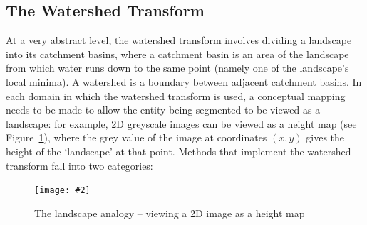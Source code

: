 \documentclass[a4paper]{article}
\newcommand{\stufigex}[5]					%
{
	\begin{figure}[#5]
	\begin{center}
		\texttt{[image: \#2]}
		\caption{#3}
		\label{#4}
	\end{center}
	\end{figure}
}
\begin{document}
\subsection{The Watershed Transform}

At a very abstract level, the watershed\footnotemark{} transform involves dividing a landscape into its catchment basins, where a catchment basin is an area of the landscape from which water runs down to the same point (namely one of the landscape's local minima). A watershed is a boundary between adjacent catchment basins. In each domain in which the watershed transform is used, a conceptual mapping needs to be made to allow the entity being segmented to be viewed as a landscape: for example, 2D greyscale images can be viewed as a height map (see Figure~\ref{fig:segmentation-watershed-landscapeanalogy}), where the grey value of the image at coordinates $(x,y)$ gives the height of the `landscape' at that point. Methods that implement the watershed transform fall into two categories:


\stufigex{height=6cm}{segmentation-watershed-landscapeanalogy.png}{The landscape analogy -- viewing a 2D image as a height map}{fig:segmentation-watershed-landscapeanalogy}{!t}
\end{document}

